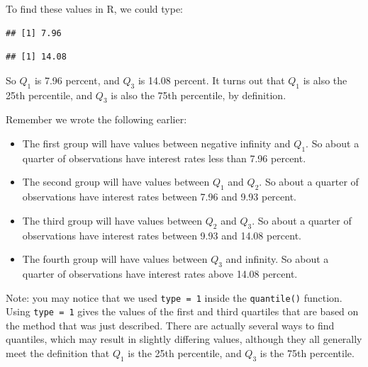 \documentclass[
]{book}
\newenvironment{Shaded}{\begin{snugshade}}{\end{snugshade}}
\newcommand{\DecValTok}[1]{\textcolor[rgb]{0.00,0.00,0.81}{#1}}
\newcommand{\FunctionTok}[1]{\textcolor[rgb]{0.13,0.29,0.53}{\textbf{#1}}}
\newcommand{\NormalTok}[1]{#1}
\newcommand{\SpecialCharTok}[1]{\textcolor[rgb]{0.81,0.36,0.00}{\textbf{#1}}}
\providecommand{\tightlist}{%
  \setlength{\itemsep}{0pt}\setlength{\parskip}{0pt}}
\begin{document}
To find these values in R, we could type:

\begin{Shaded}
\end{Shaded}

\begin{verbatim}
## [1] 7.96
\end{verbatim}

\begin{Shaded}
\end{Shaded}

\begin{verbatim}
## [1] 14.08
\end{verbatim}

So \(Q_1\) is 7.96 percent, and \(Q_3\) is 14.08 percent. It turns out that \(Q_1\) is also the 25th percentile, and \(Q_3\) is also the 75th percentile, by definition.

Remember we wrote the following earlier:

\begin{itemize}
\tightlist
\item
  The first group will have values between negative infinity and \(Q_1\). So about a quarter of observations have interest rates less than 7.96 percent.
\item
  The second group will have values between \(Q_1\) and \(Q_2\). So about a quarter of observations have interest rates between 7.96 and 9.93 percent.
\item
  The third group will have values between \(Q_2\) and \(Q_3\). So about a quarter of observations have interest rates between 9.93 and 14.08 percent.
\item
  The fourth group will have values between \(Q_3\) and infinity. So about a quarter of observations have interest rates above 14.08 percent.
\end{itemize}

Note: you may notice that we used \texttt{type\ =\ 1} inside the \texttt{quantile()} function. Using \texttt{type\ =\ 1} gives the values of the first and third quartiles that are based on the method that was just described. There are actually several ways to find quantiles, which may result in slightly differing values, although they all generally meet the definition that \(Q_1\) is the 25th percentile, and \(Q_3\) is the 75th percentile.
\end{document}

